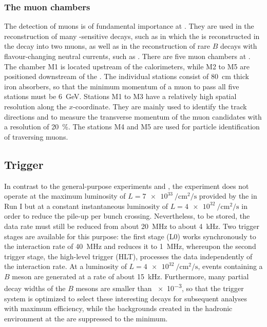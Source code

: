 \subsubsection*{The muon chambers}
\label{sec:muonchambers}

The detection of muons is of fundamental importance at \lhcb.
They are used in the reconstruction of many \mbox{\CP-sensitive} decays, such as \BdToJPsiKS in which the \jpsi is reconstructed in the decay into two muons, as well as in the reconstruction of rare $B$ decays with flavour-changing neutral currents, such as \Bsmm.
There are five muon chambers at \lhcb.
The chamber M1 is located upstream of the calorimeters, while M2 to M5 are positioned downstream of the \hcal.
The individual stations consist of \SI{80}{\centi\metre} thick iron absorbers, so that the minimum momentum of a muon to pass all five stations must be \SI{6}{\giga\electronvolt}.
Stations M1 to M3 have a relatively high spatial resolution along the $x$-coordinate.
They are mainly used to identify the track directions and to measure the transverse momentum \pt of the muon candidates with a resolution of \SI{20}{\percent}.
The stations M4 and M5 are used for particle identification of traversing muons.

\subsection{Trigger}
\label{sec:trigger}

In contrast to the general-purpose experiments \atlas and \cms, the \lhcb experiment does not operate at the maximum luminosity of $L=\SI{7e33}{\per\centi\metre\squared\per\second}$ provided by the \lhc in Run I but at a constant instantaneous luminosity of $L=\SI{4e32}{\per\centi\metre\squared\per\second}$ in order to reduce the pile-up per bunch crossing.
Nevertheless, to be stored, the data rate must still be reduced from about \SI{20}{\mega\hertz} to about \SI{4}{\kilo\hertz}.
Two trigger stages are available for this purpose: the first stage (L0) works synchronously to the interaction rate of \SI{40}{\mega\hertz} and reduces it to \SI{1}{\mega\hertz}, whereupon the second trigger stage, the high-level trigger (HLT), processes the data independently of the interaction rate.
At a luminosity of $L=\SI{4e32}{\per\centi\metre\squared\per\second}$, events containing a $B$ meson are generated at a rate of about \SI{15}{\kilo\hertz}.
Furthermore, many partial decay widths of the $B$ mesons are smaller than \num{e-3}, so that the trigger system is optimized to select these interesting decays for subsequent analyses with maximum efficiency, while the backgrounds created in the hadronic environment at the \lhc are suppressed to the minimum.

